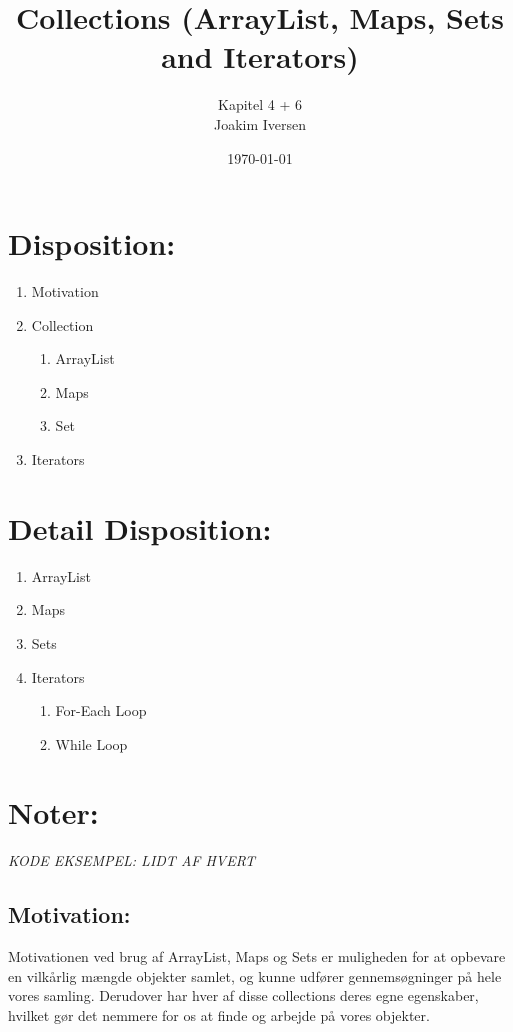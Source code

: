 \documentclass{article}
\title{Collections (ArrayList, Maps, Sets and Iterators)}
\author{Kapitel 4 + 6 \\
        Joakim Iversen}
\date{\today}
\begin{document}
\maketitle
\newpage

\section*{Disposition:}
\begin{enumerate}
    \item Motivation
    \item Collection
    \begin{enumerate}
        \item ArrayList
        \item Maps
        \item Set
    \end{enumerate}
    \item Iterators
\end{enumerate}
\newpage

\section*{Detail Disposition:}
\begin{enumerate}
    \item ArrayList
    \item Maps
    \item Sets
    \item Iterators
    \begin{enumerate}
        \item For-Each Loop
        \item While Loop
    \end{enumerate}
\end{enumerate}
\newpage

\section*{Noter:} 
\begin{center}
    \textit{KODE EKSEMPEL: LIDT AF HVERT} \\
\end{center}

\subsection*{Motivation:}
Motivationen ved brug af ArrayList, Maps og Sets er muligheden for at opbevare en vilkårlig mængde objekter samlet, og kunne udfører gennemsøgninger på hele vores samling. Derudover har hver af disse collections deres egne egenskaber, hvilket gør det nemmere for os at finde og arbejde på vores objekter.
\end{document}
